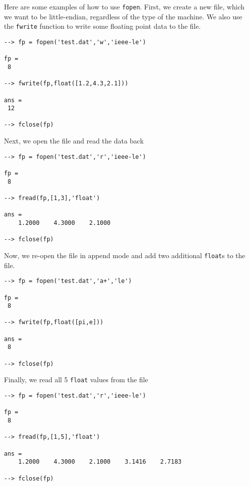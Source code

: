 Here are some examples of how to use \verb|fopen|.  First, we create a new 
file, which we want to be little-endian, regardless of the type of the machine.
We also use the \verb|fwrite| function to write some floating point data to
the file.
\begin{verbatim}
--> fp = fopen('test.dat','w','ieee-le')

fp = 
 8 

--> fwrite(fp,float([1.2,4.3,2.1]))

ans = 
 12 

--> fclose(fp)
\end{verbatim}
Next, we open the file and read the data back
\begin{verbatim}
--> fp = fopen('test.dat','r','ieee-le')

fp = 
 8 

--> fread(fp,[1,3],'float')

ans = 
    1.2000    4.3000    2.1000 

--> fclose(fp)
\end{verbatim}
Now, we re-open the file in append mode and add two additional \verb|float|s to the
file.
\begin{verbatim}
--> fp = fopen('test.dat','a+','le')

fp = 
 8 

--> fwrite(fp,float([pi,e]))

ans = 
 8 

--> fclose(fp)
\end{verbatim}
Finally, we read all 5 \verb|float| values from the file
\begin{verbatim}
--> fp = fopen('test.dat','r','ieee-le')

fp = 
 8 

--> fread(fp,[1,5],'float')

ans = 
    1.2000    4.3000    2.1000    3.1416    2.7183 

--> fclose(fp)
\end{verbatim}
